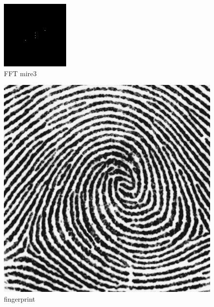 \documentclass{article}
\begin{document}
\begin{figure}
	\begin{center}
		\includegraphics[scale=0.7]{mire3_FFT}\\
		FFT mire3
	\end{center}
\end{figure}
\begin{figure}
	\begin{center}
		\includegraphics[scale=0.4]{fingerprint}\\
		fingerprint
	\end{center}
\end{figure}
\end{document}
